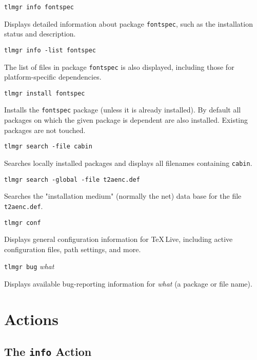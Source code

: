 \documentclass[11pt]{article}
\begin{document}
\begin{description}
\item\texttt{tlmgr info fontspec}\par 

Displays detailed information about package
\texttt{fontspec}, such as the installation status and
description.

\item\texttt{tlmgr info -list fontspec}\par 

The list of files in package \texttt{fontspec} is
also displayed, including those for platform-specific
dependencies.

\item\texttt{tlmgr install fontspec}\par 

Installs the \texttt{fontspec} package (unless it is already
installed). By default all packages on which the given
package is dependent are also installed. Existing packages
are not touched.

\item\texttt{tlmgr search -file cabin}\par 

Searches locally installed packages and displays all filenames
containing \texttt{cabin}.

\item\texttt{tlmgr search -global -file t2aenc.def} 

Searches the "installation medium" (normally the net) data base for the file \texttt{t2aenc.def}.

\item\texttt{tlmgr conf}\par

Displays general configuration information for \TeX\,Live, including active configuration files, path settings, and more. 

\item\texttt{tlmgr bug} \textsl{what}\par

Displays available bug-reporting information for \textsl{what} (a package or file name).

\end{description}

\clearpage

\section{Actions}
\label{Actions}

\subsection{The {\tt info} Action}
\label{info}
\end{document}
